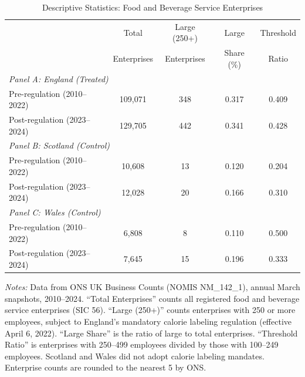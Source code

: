 \begin{table}[!t]
\centering
\caption{Descriptive Statistics: Food and Beverage Service Enterprises}
\label{tab:descriptives}
\begin{tabular}{lcccc}
\hline\hline
 & Total & Large (250+) & Large & Threshold \\
 & Enterprises & Enterprises & Share (\%) & Ratio \\
\hline
\multicolumn{5}{l}{\textit{Panel A: England (Treated)}} \\[3pt]
Pre-regulation (2010--2022) & 109,071 & 348 & 0.317 & 0.409 \\
Post-regulation (2023--2024) & 129,705 & 442 & 0.341 & 0.428 \\[6pt]
\multicolumn{5}{l}{\textit{Panel B: Scotland (Control)}} \\[3pt]
Pre-regulation (2010--2022) & 10,608 & 13 & 0.120 & 0.204 \\
Post-regulation (2023--2024) & 12,028 & 20 & 0.166 & 0.310 \\[6pt]
\multicolumn{5}{l}{\textit{Panel C: Wales (Control)}} \\[3pt]
Pre-regulation (2010--2022) & 6,808 & 8 & 0.110 & 0.500 \\
Post-regulation (2023--2024) & 7,645 & 15 & 0.196 & 0.333 \\
\hline\hline
\end{tabular}
\begin{tablenotes}[flushleft]
\small
\item \textit{Notes:} Data from ONS UK Business Counts (NOMIS NM\_142\_1), 
annual March snapshots, 2010--2024. ``Total Enterprises'' counts all registered 
food and beverage service enterprises (SIC 56). ``Large (250+)'' counts enterprises 
with 250 or more employees, subject to England's mandatory calorie labeling regulation 
(effective April 6, 2022). ``Large Share'' is the ratio of large to total enterprises. 
``Threshold Ratio'' is enterprises with 250--499 employees divided by those with 
100--249 employees. Scotland and Wales did not adopt calorie labeling mandates. 
Enterprise counts are rounded to the nearest 5 by ONS.
\end{tablenotes}
\end{table}
